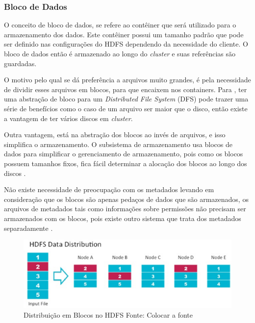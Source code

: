             \subsubsection{Bloco de Dados}

                O conceito de bloco de dados, se refere ao contêiner que será utilizado para o armazenamento
                dos dados. Este contêiner possui um tamanho padrão que pode ser definido nas configurações
                do HDFS dependendo da necessidade do cliente. O bloco de dados então é armazenado ao longo
                do \textit{cluster} e suas referências são guardadas.

                O motivo pelo qual se dá preferência a arquivos muito grandes, é pela necessidade de dividir
                esses arquivos em blocos, para que encaixem nos containers. Para ,
                ter uma abstração de bloco para um \textit{Distributed File System} (DFS) pode trazer uma série
                de benefícios como o caso de um arquivo ser maior que o disco, então existe a vantagem de ter
                vários discos em \textit{cluster}.

                Outra vantagem, está na abstração dos blocos ao invés de arquivos, e isso simplifica o
                armazenamento. O subsistema de armazenamento usa blocos de dados para simplificar
                o gerenciamento de armazenamento, pois como os blocos possuem tamanhos fixos, fica
                fácil determinar a alocação dos blocos ao longo dos discos \cite{white2015}.

                Não existe necessidade de preocupação com os metadados levando em consideração
                que os blocos são apenas pedaços de dados que são armazenados, os arquivos de
                metadados tais como informações sobre permissões não precisam ser armazenados com
                os blocos, pois existe outro sistema que trata dos metadados separadamente
                \cite{shvachko2010}.

                \begin{figure}[ht!]
                    \centering
                    \includegraphics[keepaspectratio=true,scale=0.75]
                        {figuras/figura1.eps}
                    \caption[Distribuição em Blocos no HDFS]{Distribuição em Blocos no HDFS
                    \protect\linebreak Fonte: Colocar a fonte}
                    \label{figura1}
                \end{figure}

